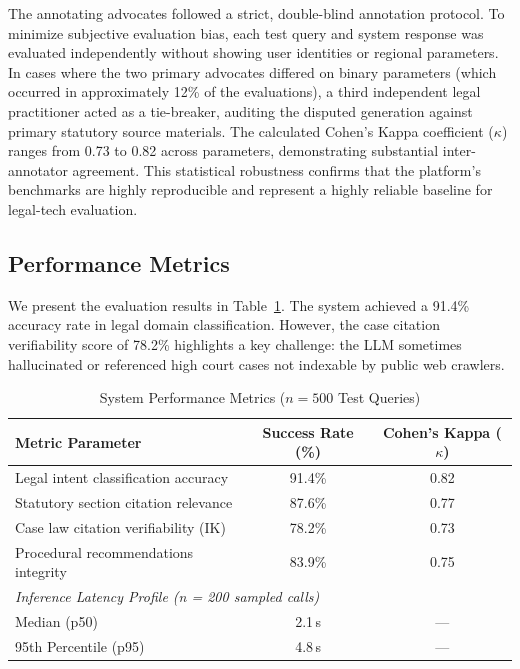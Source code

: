 \documentclass[conference]{IEEEtran}
\begin{document}
The annotating advocates followed a strict, double-blind annotation protocol. To minimize subjective evaluation bias, each test query and system response was evaluated independently without showing user identities or regional parameters. In cases where the two primary advocates differed on binary parameters (which occurred in approximately 12\% of the evaluations), a third independent legal practitioner acted as a tie-breaker, auditing the disputed generation against primary statutory source materials. The calculated Cohen's Kappa coefficient ($\kappa$) ranges from 0.73 to 0.82 across parameters, demonstrating substantial inter-annotator agreement. This statistical robustness confirms that the platform's benchmarks are highly reproducible and represent a highly reliable baseline for legal-tech evaluation.

\subsection{Performance Metrics}
We present the evaluation results in Table~\ref{tab:accuracy}. The system achieved a 91.4\% accuracy rate in legal domain classification. However, the case citation verifiability score of 78.2\% highlights a key challenge: the LLM sometimes hallucinated or referenced high court cases not indexable by public web crawlers.

\begin{table}[!t]
\centering
\renewcommand{\arraystretch}{1.3}
\caption{System Performance Metrics ($n = 500$ Test Queries)}
\label{tab:accuracy}
\begin{tabularx}{\columnwidth}{@{} X c c @{}}
\toprule
\textbf{Metric Parameter} & \textbf{Success Rate (\%)} & \textbf{Cohen's Kappa ($\kappa$)} \\
\midrule
Legal intent classification accuracy  & 91.4\% & 0.82 \\
Statutory section citation relevance  & 87.6\% & 0.77 \\
Case law citation verifiability (IK)  & 78.2\% & 0.73 \\
Procedural recommendations integrity & 83.9\% & 0.75 \\
\midrule
\multicolumn{3}{l}{\textit{Inference Latency Profile (n = 200 sampled calls)}} \\
\quad Median (p50) & 2.1\,s & --- \\
\quad 95th Percentile (p95) & 4.8\,s & --- \\
\bottomrule
\end{tabularx}
\end{table}
\end{document}
